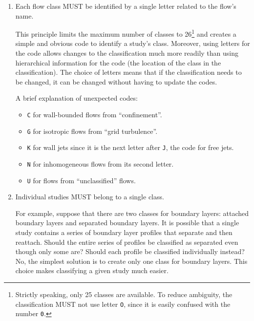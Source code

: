 \begin{enumerate}


\item
Each flow class MUST be identified by a single letter related to the flow's
name.

This principle limits the maximum number of classes to 26\footnote{
Strictly speaking, only 25 classes are available.  To reduce ambiguity, the
classification MUST not use letter \texttt{O}, since it is easily confused with the
number \texttt{0}.
} and creates a simple and obvious code to identify a study's class.  Moreover,
using letters for the code allows changes to the classification much more
readily than using hierarchical information for the code (the location of the
class in the classification).  The choice of letters means that if the
classification needs to be changed, it can be changed without having to update
the codes.

A brief explanation of unexpected codes:

    \begin{itemize}

    \item
    \texttt{C} for wall-bounded flows from ``confinement''.

    \item
    \texttt{G} for isotropic flows from ``grid turbulence''.

    \item
    \texttt{K} for wall jets since it is the next letter after \texttt{J}, the
    code for free jets.

    \item
    \texttt{N} for inhomogeneous flows from its second letter.

    \item
    \texttt{U} for flows from ``unclassified'' flows.

    \end{itemize}


\item
Individual studies MUST belong to a single class.

For example, suppose that there are two classes for boundary layers: attached
boundary layers and separated boundary layers.  It is possible that a single
study contains a series of boundary layer profiles that separate and then
reattach.  Should the entire series of profiles be classified as separated even
though only some are?  Should each profile be classified individually instead?
No, the simplest solution is to create only one class for boundary layers.
This choice makes classifying a given study much easier.



\end{enumerate}
